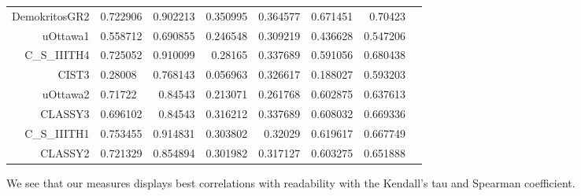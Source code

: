 \begin{table}[htbp]
\begin{tabular}{rlrrrrrr}
    DemokritosGR2 & 0.722906 & 0.902213 & 0.350995 & 0.364577 & 0.671451 & 0.70423 \\
    uOttawa1 & 0.558712 & 0.690855 & 0.246548 & 0.309219 & 0.436628 & 0.547206 \\
    C\_S\_IIITH4 & 0.725052 & 0.910099 & 0.28165 & 0.337689 & 0.591056 & 0.680438 \\
    CIST3 & 0.28008 & 0.768143 & 0.056963 & 0.326617 & 0.188027 & 0.593203 \\
    uOttawa2 & 0.71722 & 0.84543 & 0.213071 & 0.261768 & 0.602875 & 0.637613 \\
    CLASSY3  & 0.696102 & 0.84543 & 0.316212 & 0.337689 & 0.608032 & 0.669336 \\
    C\_S\_IIITH1 & 0.753455 & 0.914831 & 0.303802 & 0.32029 & 0.619617 & 0.667749 \\
    CLASSY2 & 0.721329 & 0.854894 & 0.301982 & 0.317127 & 0.603275 & 0.651888 \\
    \hline
    \end{tabular}%
  \label{tab:addlabel}%
\end{table}%
We see that our measures displays best correlations with readability with the Kendall's tau
and Spearman coefficient.
